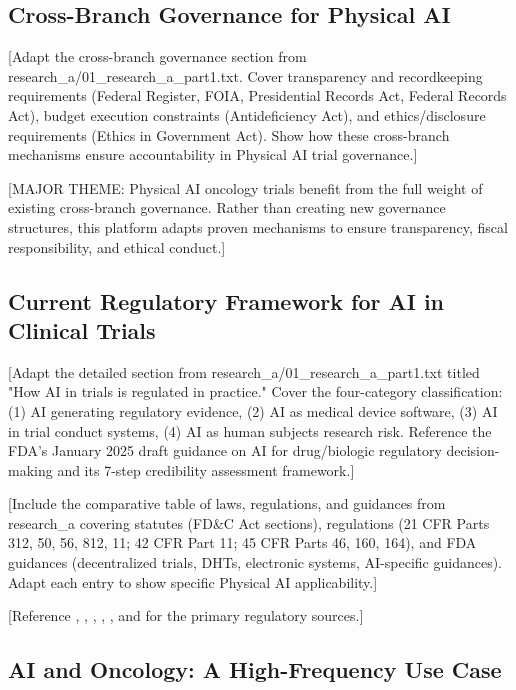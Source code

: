 \subsection{Cross-Branch Governance for Physical AI}
\label{subsec:cross-branch}

[Adapt the cross-branch governance section from research\_a/01\_research\_a\_part1.txt.
Cover transparency and recordkeeping requirements (Federal Register, FOIA,
Presidential Records Act, Federal Records Act), budget execution constraints
(Antideficiency Act), and ethics/disclosure requirements (Ethics in Government
Act). Show how these cross-branch mechanisms ensure accountability in Physical
AI trial governance.]

[MAJOR THEME: Physical AI oncology trials benefit from the full weight of
existing cross-branch governance. Rather than creating new governance structures,
this platform adapts proven mechanisms to ensure transparency, fiscal
responsibility, and ethical conduct.]

\subsection{Current Regulatory Framework for AI in Clinical Trials}
\label{subsec:current-ai-framework}

[Adapt the detailed section from research\_a/01\_research\_a\_part1.txt titled
"How AI in trials is regulated in practice." Cover the four-category
classification: (1) AI generating regulatory evidence, (2) AI as medical device
software, (3) AI in trial conduct systems, (4) AI as human subjects research
risk. Reference the FDA's January 2025 draft guidance on AI for drug/biologic
regulatory decision-making and its 7-step credibility assessment framework.]

[Include the comparative table of laws, regulations, and guidances from
research\_a covering statutes (FD\&C Act sections), regulations (21 CFR Parts
312, 50, 56, 812, 11; 42 CFR Part 11; 45 CFR Parts 46, 160, 164), and FDA
guidances (decentralized trials, DHTs, electronic systems, AI-specific
guidances). Adapt each entry to show specific Physical AI applicability.]

[Reference \cite{cfr-part-312}, \cite{cfr-part-50}, \cite{ich-e6r3},
\cite{hipaa}, \cite{fda-clinical-trials-guidance}, and
\cite{fda-oncology-guidance} for the primary regulatory sources.]

\subsection{AI and Oncology: A High-Frequency Use Case}
\label{subsec:ai-oncology}

